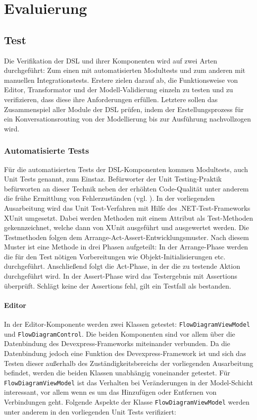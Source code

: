 \chapter{Evaluierung}

\section{Test}
Die Verifikation der DSL und ihrer Komponenten wird auf zwei Arten durchgeführt: Zum einen mit automatisierten Modultests und zum anderen mit manuellen Integrationstests. Erstere zielen darauf ab, die Funktionsweise von Editor, Transformator und der Modell-Validierung einzeln zu testen und zu verifizieren, dass diese ihre Anforderungen erfüllen. Letztere sollen das Zusammenspiel aller Module der DSL prüfen, indem der Erstellungsprozess für ein Konversationsrouting von der Modellierung bis zur Ausführung nachvollzogen wird.

\subsection{Automatisierte Tests}
Für die automatisierten Tests der DSL-Komponenten kommen Modultests, auch Unit Tests genannt, zum Einstaz. Befürworter der Unit Testing-Praktik befürworten an dieser Technik neben der erhöhten Code-Qualität unter anderem die frühe Ermittlung von Fehlerzuständen (vgl. \cite{Novoseltseva:17}). In der vorliegenden Ausarbeitung wird das Unit Test-Verfahren mit Hilfe des .NET-Test-Frameworks XUnit umgesetzt. Dabei werden Methoden mit einem Attribut als Test-Methoden gekennzeichnet, welche dann von XUnit ausgeführt und ausgewertet werden. Die Testmethoden folgen dem Arrange-Act-Assert-Entwicklungsmuster. Nach diesem Muster ist eine Methode in drei Phasen aufgeteilt: In der Arrange-Phase werden die für den Test nötigen Vorbereitungen wie Objekt-Initialisierungen etc. durchgeführt. Anschließend folgt die Act-Phase, in der die zu testende Aktion durchgeführt wird. In der Assert-Phase wird das Testergebnis mit Assertions überprüft. Schlägt keine der Assertions fehl, gilt ein Testfall als bestanden.

\subsubsection{Editor}
In der Editor-Komponente werden zwei Klassen getestet: \texttt{FlowDiagramViewModel} und \texttt{FlowDiagramControl}. Die beiden Komponenten sind vor allem über die Datenbindung des Devexpress-Frameworks miteinander verbunden. Da die Datenbindung jedoch eine Funktion des Devexpress-Framework ist und sich das Testen dieser außerhalb des Zuständigkeitsbereichs der vorliegenden Ausarbeitung befindet, werden die beiden Klassen unabhängig voneinander getestet. Für \texttt{FlowDiagramViewModel} ist das Verhalten bei Veränderungen in der Model-Schicht interessant, vor allem wenn es um das Hinzufügen oder Entfernen von Verbindungen geht. Folgende Aspekte der Klasse \texttt{FlowDiagramViewModel} werden unter anderem in den vorliegenden Unit Tests verifiziert: 

